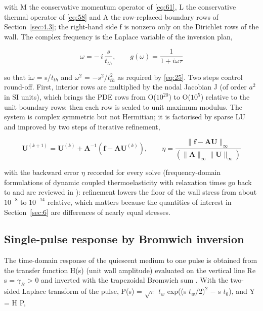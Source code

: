 \documentclass[preprint,12pt]{elsarticle}
\begin{document}
with M the conservative momentum operator of \eqref{eq:61}, L the conservative thermal operator of \eqref{eq:58} and A the row-replaced boundary rows of Section~\ref{sec:4.3}; the right-hand side f is nonzero only on the Dirichlet rows of the wall. The complex frequency is the Laplace variable of the inversion plan,

\begin{equation}
\omega=-\,i\,\frac{s}{t_{th}},\qquad g(\omega)=\frac{1}{1+i\omega\tau} 
\label{eq:71}
\end{equation}

so that i$\omega$ = s/$t_{th}$ and $\omega^{2}$ = $-s^{2}$/$t_{th}^{2}$ as required by \eqref{eq:25}. Two steps control round-off. First, interior rows are multiplied by the nodal Jacobian J (of order $a^{2}$ in SI units), which brings the PDE rows from O($10^{20}$) to O($10^{5}$) relative to the unit boundary rows; then each row is scaled to unit maximum modulus. The system is complex symmetric but not Hermitian; it is factorised by sparse LU and improved by two steps of iterative refinement,

\begin{equation}
\mathbf{U}^{(k+1)}=\mathbf{U}^{(k)}+\mathbf{A}^{-1}\left(\mathbf{f}-\mathbf{A}\mathbf{U}^{(k)}\right),\qquad \eta=\frac{\|\mathbf{f}-\mathbf{A}\mathbf{U}\|_{\infty}}{\left(\|\mathbf{A}\|_{\infty}\|\mathbf{U}\|_{\infty}\right)} 
\label{eq:72}
\end{equation}

with the backward error $\eta$ recorded for every solve (frequency-domain formulations of dynamic coupled thermoelasticity with relaxation times go back to \cite{prevost1983} and are reviewed in \cite{narayanan1982}): refinement lowers the floor of the wall stress from about $10^{-8}$ to $10^{-14}$ relative, which matters because the quantities of interest in Section~\ref{sec:6} are differences of nearly equal stresses.

\subsection{Single-pulse response by Bromwich inversion}
\label{sec:4.6}

The time-domain response of the quiescent medium to one pulse is obtained from the transfer function H(s) (unit wall amplitude) evaluated on the vertical line Re s = $\gamma_{B}$ > 0 and inverted with the trapezoidal Bromwich sum \cite{durbin1974,crump1976}. With the two-sided Laplace transform of the pulse, P(s) = $\sqrt \pi$ $t_{w}$ exp((s $t_{w}$/2$)^{2}$ $-$ s $t_{0}$), and Y = H P,
\end{document}
